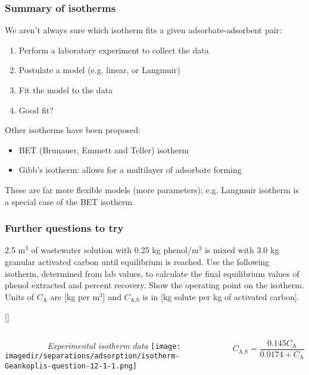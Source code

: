 \begin{frame}\frametitle{Summary of isotherms}
	We aren't always sure which isotherm fits a given adsorbate-adsorbent pair:
	\begin{enumerate}
		\item	Perform a laboratory experiment to collect the data
		\item	Postulate a model (e.g. linear, or Langmuir)
		\item	Fit the model to the data
		\item	Good fit?
	\end{enumerate}

	\vspace{24pt}
	Other isotherms have been proposed:
	\begin{itemize}
		\item	BET (Brunauer, Emmett and Teller) isotherm
		\item	Gibb's isotherm: allows for a multilayer of adsorbate forming
	\end{itemize}

	These are far more flexible models (more parameters); e.g. Langmuir isotherm is a special case of the BET isotherm.
\end{frame}

\begin{frame}\frametitle{Further questions to try}

	2.5 $\text{m}^3$ of wastewater solution with 0.25 kg phenol/$\text{m}^3$ is mixed with 3.0 kg granular activated carbon until equilibrium is reached. Use the following isotherm, determined from lab values, to calculate the final equilibrium values of phenol extracted and percent recovery. Show the operating point on the isotherm. {\footnotesize Units of $C_\text{A}$ are [kg per $\text{m}^3$] and $C_\text{A,S}$ is in [kg solute per kg of activated carbon].}

	\vspace{1pt}

	{\small [{}]}

	\begin{columns}[t]

			\vspace{-12pt}
			\begin{center}
				{\scriptsize\emph{~~~~~~~~~~Experimental isotherm data}}
				\texttt{[image: \\imagedir/separations/adsorption/isotherm-Geankoplis-question-12-1-1.png]}
			\end{center}
			\[C_\text{A,S} = \frac{0.145 C_\text{A}}{0.0174 + C_\text{A}}\]
	\end{columns}
\end{frame}

